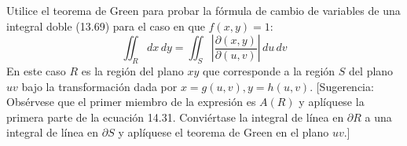 \item Utilice el teorema de Green para probar la fórmula de cambio de variables de una integral doble (13.69) para el caso en que $f(x, y) = 1$:
    \[ \iint_R dx \, dy = \iint_S \left| \frac{\partial(x, y)}{\partial(u, v)} \right| \, du \, dv \]
    En este caso $R$ es la región del plano $xy$ que corresponde a la región $S$ del plano $uv$ bajo la transformación dada por $x = g(u, v), y = h(u, v)$. [Sugerencia: Obsérvese que el primer miembro de la expresión es $A(R)$ y aplíquese la primera parte de la ecuación 14.31. Conviértase la integral de línea en $\partial R$ a una integral de línea en $\partial S$ y aplíquese el teorema de Green en el plano $uv$.]
